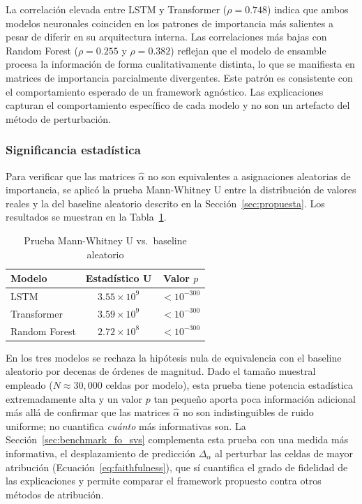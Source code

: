 \documentclass[conference, letterpaper]{IEEEtran}
\begin{document}
La correlación elevada entre LSTM y Transformer ($\rho = 0.748$) 
indica que ambos modelos neuronales coinciden en los patrones de 
importancia más salientes a pesar de diferir en su arquitectura 
interna. Las correlaciones más bajas con Random Forest ($\rho = 
0.255$ y $\rho = 0.382$) reflejan que el modelo de ensamble procesa 
la información de forma cualitativamente distinta, lo que se 
manifiesta en matrices de importancia parcialmente divergentes. Este 
patrón es consistente con el comportamiento esperado de un framework
agnóstico. Las explicaciones capturan el comportamiento específico
de cada modelo y no son un artefacto del método de perturbación.

\subsubsection{Significancia estadística}

Para verificar que las matrices $\hat{\alpha}$ no son equivalentes 
a asignaciones aleatorias de importancia, se aplicó la prueba 
Mann-Whitney U entre la distribución de valores reales y la del 
baseline aleatorio descrito en la Sección~\ref{sec:propuesta}. 
Los resultados se muestran en la Tabla~\ref{tab:significancia}.

\begin{table}[h]
\centering
\caption{Prueba Mann-Whitney U vs.\ baseline aleatorio}
\label{tab:significancia}
\begin{tabular}{lcc}
\toprule
\textbf{Modelo} & \textbf{Estadístico U} & \textbf{Valor $p$} \\
\midrule
LSTM          & $3.55 \times 10^{9}$ & $< 10^{-300}$ \\
Transformer   & $3.59 \times 10^{9}$ & $< 10^{-300}$ \\
Random Forest & $2.72 \times 10^{8}$ & $< 10^{-300}$ \\
\bottomrule
\end{tabular}
\end{table}

En los tres modelos se rechaza la hipótesis nula de equivalencia 
con el baseline aleatorio por decenas de órdenes de magnitud. 
Dado el tamaño muestral empleado ($N \approx 30{,}000$ celdas por 
modelo), esta prueba tiene potencia estad\'istica extremadamente 
alta y un valor $p$ tan pequeño aporta poca información adicional 
más allá de confirmar que las matrices $\hat{\alpha}$ no son 
indistinguibles de ruido uniforme; no cuantifica \emph{cuánto} más 
informativas son. La Sección~\ref{sec:benchmark_fo_svs} complementa
esta prueba con una medida más informativa, el desplazamiento de
predicción $\Delta_\alpha$ al perturbar las celdas de mayor
atribución (Ecuación~\ref{eq:faithfulness}), que sí cuantifica el 
grado de fidelidad de las explicaciones y permite comparar el 
framework propuesto contra otros métodos de atribución.
\end{document}

